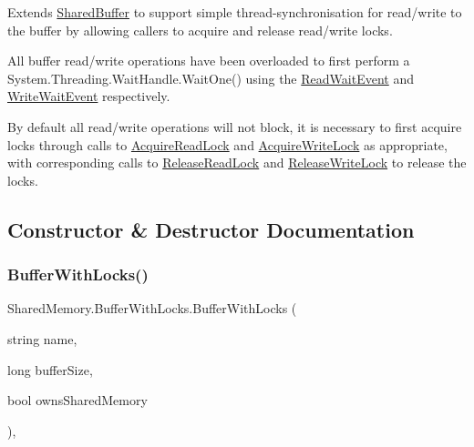Extends \hyperlink{class_shared_memory_1_1_shared_buffer}{Shared\+Buffer} to support simple thread-\/synchronisation for read/write to the buffer by allowing callers to acquire and release read/write locks.

All buffer read/write operations have been overloaded to first perform a System.\+Threading.\+Wait\+Handle.\+Wait\+One() using the \hyperlink{class_shared_memory_1_1_buffer_with_locks_a93181710ceef6b88e2d7647f976f1e79}{Read\+Wait\+Event} and \hyperlink{class_shared_memory_1_1_buffer_with_locks_a5d7e21579a5af649e828e3a4e70f67e8}{Write\+Wait\+Event} respectively.

By default all read/write operations will not block, it is necessary to first acquire locks through calls to \hyperlink{class_shared_memory_1_1_buffer_with_locks_a836831324da16160986c52f8e063ff10}{Acquire\+Read\+Lock} and \hyperlink{class_shared_memory_1_1_buffer_with_locks_a309b191c69586043c60362e401732940}{Acquire\+Write\+Lock} as appropriate, with corresponding calls to \hyperlink{class_shared_memory_1_1_buffer_with_locks_adb9c96d006822a210e98f71c22c05bf5}{Release\+Read\+Lock} and \hyperlink{class_shared_memory_1_1_buffer_with_locks_a9032d217f1f869d62ea29b3a3ea3fb98}{Release\+Write\+Lock} to release the locks.

\subsection{Constructor \& Destructor Documentation}
\mbox{\label{class_shared_memory_1_1_buffer_with_locks_ac8f5ccb965d0a899744f5364c8140480}} 
\subsubsection{\texorpdfstring{Buffer\+With\+Locks()}{BufferWithLocks()}}
{\footnotesize\ttfamily Shared\+Memory.\+Buffer\+With\+Locks.\+Buffer\+With\+Locks (\begin{DoxyParamCaption}\item[{string}]{name,  }\item[{long}]{buffer\+Size,  }\item[{bool}]{owns\+Shared\+Memory }\end{DoxyParamCaption})\hspace{0.3cm}{\ttfamily [inline]}, {\ttfamily [protected]}}



